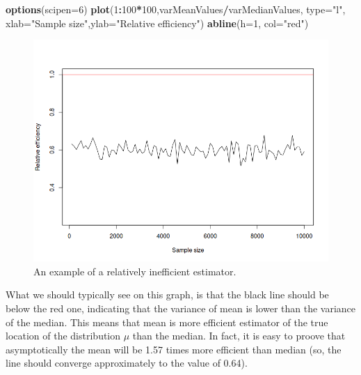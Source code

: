 \documentclass[
]{book}
\newenvironment{Shaded}{\begin{snugshade}}{\end{snugshade}}
\newcommand{\AttributeTok}[1]{\textcolor[rgb]{0.13,0.29,0.53}{#1}}
\newcommand{\DecValTok}[1]{\textcolor[rgb]{0.00,0.00,0.81}{#1}}
\newcommand{\FunctionTok}[1]{\textcolor[rgb]{0.13,0.29,0.53}{\textbf{#1}}}
\newcommand{\NormalTok}[1]{#1}
\newcommand{\SpecialCharTok}[1]{\textcolor[rgb]{0.81,0.36,0.00}{\textbf{#1}}}
\newcommand{\StringTok}[1]{\textcolor[rgb]{0.31,0.60,0.02}{#1}}
\theoremstyle{definition}
\theoremstyle{definition}
\theoremstyle{definition}
\theoremstyle{definition}
\theoremstyle{remark}
\begin{document}
\begin{Shaded}
\begin{Highlighting}[]
\FunctionTok{options}\NormalTok{(}\AttributeTok{scipen=}\DecValTok{6}\NormalTok{)}
\FunctionTok{plot}\NormalTok{(}\DecValTok{1}\SpecialCharTok{:}\DecValTok{100}\SpecialCharTok{*}\DecValTok{100}\NormalTok{,varMeanValues}\SpecialCharTok{/}\NormalTok{varMedianValues, }\AttributeTok{type=}\StringTok{"l"}\NormalTok{, }\AttributeTok{xlab=}\StringTok{"Sample size"}\NormalTok{,}\AttributeTok{ylab=}\StringTok{"Relative efficiency"}\NormalTok{)}
\FunctionTok{abline}\NormalTok{(}\AttributeTok{h=}\DecValTok{1}\NormalTok{, }\AttributeTok{col=}\StringTok{"red"}\NormalTok{)}
\end{Highlighting}
\end{Shaded}

\begin{figure}
\centering
\includegraphics{images/02-statistics-efficiency.png}
\caption{\label{fig:statsEfficiecny}An example of a relatively inefficient estimator.}
\end{figure}

What we should typically see on this graph, is that the black line should be below the red one, indicating that the variance of mean is lower than the variance of the median. This means that mean is more efficient estimator of the true location of the distribution \(\mu\) than the median. In fact, it is easy to proove that asymptotically the mean will be 1.57 times more efficient than median \citep{WikipediaMedianEfficiency2020} (so, the line should converge approximately to the value of 0.64).
\end{document}
